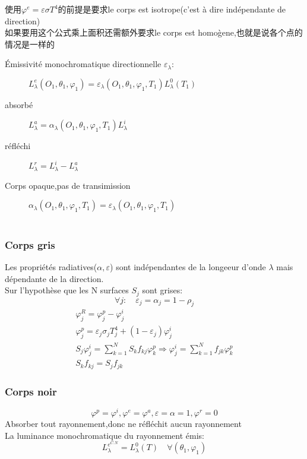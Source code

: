 \documentclass[openany]{book}
\begin{document}
使用$\varphi^e=\varepsilon \sigma T^4$的前提是要求le corps est isotrope(c'est \`a dire ind\'ependante de direction)\\
如果要用这个公式乘上面积还需额外要求le corps est homo\`gene,也就是说各个点的情况是一样的

\begin{description}
\item [\'Emissivit\'e monochromatique directionnelle $\varepsilon_{\lambda}$:] $L_{\lambda }^e(O_1,\theta_1,\varphi_1) = \varepsilon_{\lambda }(O_1,\theta_1,\varphi_1,T_1)L_{\lambda }^0(T_1)$
\item [absorb\'e]  $L_{\lambda}^a =\alpha_{\lambda }(O_1,\theta_1,\varphi_1,T_1)L_{\lambda}^i $
\item [r\'efl\'echi]  $L_{\lambda}^r = L_{\lambda}^i - L_{\lambda}^a$
\item [Corps opaque,pas de transimission] $\alpha_{\lambda }(O_1,\theta_1,\varphi_1,T_1)=\varepsilon_{\lambda }(O_1,\theta_1,\varphi_1,T_1)$
\end{description}

\begin{eqnarray}
\end{eqnarray}

\subsubsection{Corps gris}
Les propri\'et\'es radiatives($\alpha,\varepsilon$) sont ind\'ependantes de la longeeur d'onde $\lambda $ mais d\'ependante de la direction.\\
Sur l'hypoth\`ese que les N surfaces $S_j$ sont grises:
$$\forall j: \quad \varepsilon_j =\alpha_j = 1- \rho_j$$
\begin{eqnarray}
\varphi_j^R=\varphi_j^p - \varphi_j^i \\
\varphi_j^p = \varepsilon_j \sigma_j T_j^4 +(1-\varepsilon_j)\varphi_j^i\\
S_j \varphi_j^i = \sum_{k=1}^N S_k f_{kj}\varphi_k^p \Rightarrow \varphi_j^i = \sum_{k=1}^N f_{jk}\varphi_k^p\\
S_k f_{kj}=S_j f_{jk}
\end{eqnarray}
\subsubsection{Corps noir}
$$\varphi^p = \varphi^i,\varphi^e = \varphi^a,\varepsilon=\alpha=1,\varphi^r=0$$
Absorber tout rayonnement,donc ne r\'efl\'echit aucun rayonnement \\
La luminance monochromatique du rayonnement \'emis:
$$L_{\lambda}^{e^{C.N}}= L_{\lambda}^0(T) \quad \forall(\theta_1,\varphi_1)$$
\end{document}
